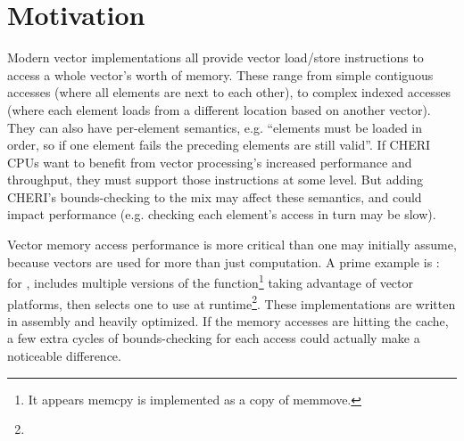 \documentclass[../thesis]{subfiles}
\begin{document}


\section{Motivation}
Modern vector implementations all provide vector load/store instructions to access a whole vector's worth of memory.
These range from simple contiguous accesses (where all elements are next to each other), to complex indexed accesses (where each element loads from a different location based on another vector).
They can also have per-element semantics, e.g. ``elements must be loaded in order, so if one element fails the preceding elements are still valid''\cite[Section 7.7]{specification-RVV-v1.0}.
If CHERI CPUs want to benefit from vector processing's increased performance and throughput, they must support those instructions at some level.
But adding CHERI's bounds-checking to the mix may affect these semantics, and could impact performance (e.g. checking each element's access in turn may be slow).

\label{vectorized_memcpy}Vector memory access performance is more critical than one may initially assume, because vectors are used for more than just computation.
A prime example is : for ,  includes multiple versions of the function\footnote{It appears memcpy is implemented as a copy of memmove.} taking advantage of vector platforms, then selects one to use at runtime\footnote{}.
These implementations are written in assembly and heavily optimized.
If the memory accesses are hitting the cache, a few extra cycles of bounds-checking for each access could actually make a noticeable difference.
\end{document}
